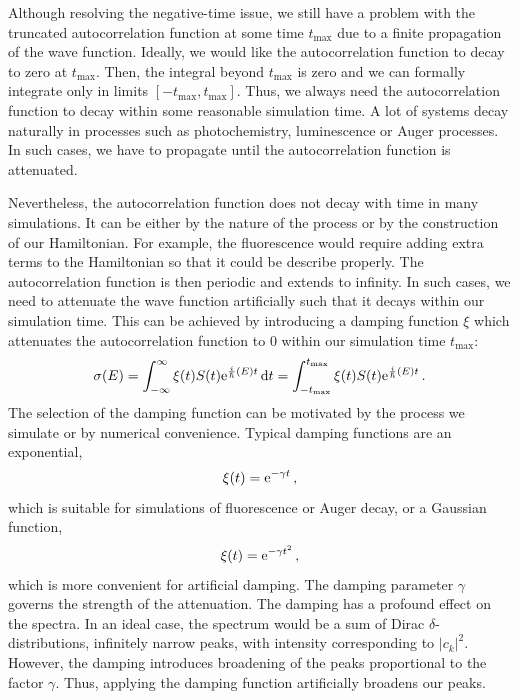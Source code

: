 Although resolving the negative-time issue, we still have a problem with the truncated autocorrelation function at some time $t_\mathrm{max}$ due to a finite propagation of the wave function. Ideally, we would like the autocorrelation function to decay to zero at $t_\mathrm{max}$. Then, the integral beyond $t_\mathrm{max}$ is zero and we can formally integrate only in limits $[-t_\mathrm{max}, t_\mathrm{max}]$. Thus, we always need the autocorrelation function to decay within some reasonable simulation time. A lot of systems decay naturally in processes such as photochemistry, luminescence or Auger processes. In such cases, we have to propagate until the autocorrelation function is attenuated.

Nevertheless, the autocorrelation function does not decay with time in many simulations. It can be either by the nature of the process or by the construction of our Hamiltonian. For example, the fluorescence would require adding extra terms to the Hamiltonian so that it could be describe properly. The autocorrelation function is then periodic and extends to infinity. In such cases, we need to attenuate the wave function artificially such that it decays within our simulation time. This can be achieved by introducing a damping function $\xi$ which attenuates the autocorrelation function to 0 within our simulation time $t_\mathrm{max}$:
\begin{equation}
    \sigma(E) = \int_{-\infty}^{\infty} \xi(t) S(t) \mathrm{e}^{\frac{i}{\hbar}(E)t}  \mathop{}\!\mathrm{d} t =  \int_{-t_\mathrm{max}}^{t_\mathrm{max}} \xi(t) S(t) \mathrm{e}^{\frac{i}{\hbar}(E)t}\, .
    \label{eq:damping1}
\end{equation}
The selection of the damping function can be motivated by the process we simulate or by numerical convenience.
Typical damping functions are an exponential, 
\begin{equation}
    \xi(t) = \mathrm{e}^{-\gamma t} \, ,
\end{equation}
which is suitable for simulations of fluorescence or Auger decay, or a  Gaussian function,
\begin{equation}
    \xi(t) = \mathrm{e}^{-\gamma t^2} \, ,
    \label{eq:gaussdamping}
\end{equation}
which is more convenient for artificial damping. The damping parameter $\gamma$ governs the strength of the attenuation. The damping has a profound effect on the spectra. In an ideal case, the spectrum would be a sum of Dirac $\delta$-distributions, infinitely narrow peaks, with intensity corresponding to $|c_k|^2$. However, the damping introduces broadening of the peaks proportional to the factor $\gamma$. Thus, applying the damping function artificially broadens our peaks. 

